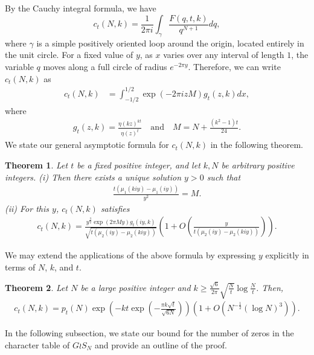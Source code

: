 \documentclass[11pt]{amsart}
\theoremstyle{plain}
\newtheorem{theorem}{Theorem}[section]
\numberwithin{equation}{section}
\begin{document}
	By the Cauchy integral formula, we have
	\begin{equation*}
		c_{t}(N,k)=\frac{1}{2\pi i}\int_{\gamma}\frac{F(q,t,k)}{q^{N+1}}dq, 
	\end{equation*}
	where $\gamma$ is a simple positively oriented loop around the origin, located entirely in the unit circle. For a fixed value of $y$, as $x$ varies over any interval of length $1$, the variable $q$ moves along a full circle of radius $e^{-2\pi y}$. Therefore, we can write $c_t(N,k)$ as
	\begin{align}\label{eq-integral}
		c_{t}(N,k)&=\int_{-1/2}^{1/2} \exp\left( -2\pi izM\right)g_{t}(z,k)dx,
	\end{align}
	where 
	\begin{align}\label{eq-atz}
		g_{t}(z,k)=\frac{\eta(kz)^{kt}}{\eta(z)^{t}}\quad\text{and}\quad M=N+\frac{(k^{2}-1)t}{24}.
	\end{align}
	We state our general asymptotic formula for $c_t(N,k)$ in the following theorem.
	\begin{theorem}\label{thm-1.1}
		Let $t$ be a fixed positive integer, and let $k, N$ be arbitrary positive integers.
		\newline
		(i) Then there exists a unique solution $y>0$ such that
		\begin{align}\label{eq-t1.1}
			\frac{t(\mu_1(kiy)-\mu_1(iy))}{y^{2}}=M.
		\end{align}
		(ii) For this $y$, $c_t(N,k)$ satisfies
		\begin{align*}
			c_t(N,k)=\frac{y^{\frac{3}{2}}\exp(2\pi My)g_{t}(iy,k)}{\sqrt{t(\mu_{2}(iy)-\mu_2(kiy))}}\left(1+O\left(\frac{y}{t(\mu_{2}(iy)-\mu_2(kiy))}\right)\right).    
		\end{align*}
	\end{theorem} 
	We may extend the applications of the above formula by expressing $y$ explicitly in terms of $N$, $k$, and $t$.
	\begin{theorem}\label{thm-ctNm}
		Let $N$ be a large positive integer and $k\ge\frac{\sqrt{6}}{2\pi}\sqrt{\frac{N}{t}}\log \frac{N}{t}$. Then, 
		\begin{align*}
			c_t(N,k)=p_t(N)\exp\left(- kt\exp\left(-\frac{\pi k\sqrt{t}}{\sqrt{6N}}\right)\right)\left(1+O\left(N^{-\frac{1}{2}}(\log N)^{3}\right)\right).
		\end{align*}
	\end{theorem} 
	In the following subsection, we state our bound for the number of zeros in the character table of $G\wr S_N$ and provide an outline of the proof.
\end{document}

